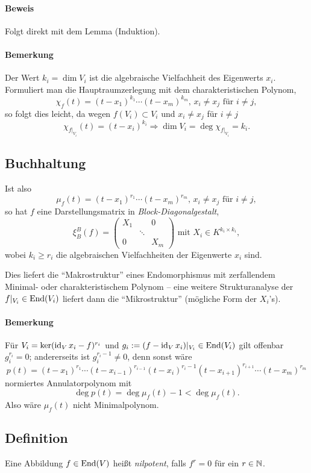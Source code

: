 \paragraph{Beweis}
	Folgt direkt mit dem Lemma (Induktion).

\paragraph{Bemerkung}
	Der Wert $ k_i = \dim V_i $ ist die algebraische Vielfachheit des Eigenwerts $ x_i $. Formuliert man die Hauptraumzerlegung mit dem charakteristischen Polynom,
		\[ \chi_f(t) = (t-x_1)^{k_1}\cdots (t-x_m)^{k_m},\, x_i \neq x_j \text{ für } i\neq j, \]
	so folgt dies leicht, da wegen $ f(V_i)\subset V_i $ und $ x_i\neq x_j $ für $ i\neq j $
		\[ \chi_{f|_{V_i}}(t) = (t-x_i)^{k_i}\Rightarrow \dim V_i = \deg \chi_{f|_{V_i}} = k_i. \]
\subsection{Buchhaltung}
	Ist also
		\[ \mu_f(t) = (t-x_1)^{r_1}\cdots (t-x_m)^{r_m},\, x_i\neq x_j \text{ für }i\neq j, \]
	so hat $ f $ eine Darstellungsmatrix in \emph{Block-Diagonalgestalt},
		\[ \xi_B^B(f) = \begin{pmatrix}
		X_1 & & 0 \\
		& \ddots & \\
		0 & & X_m
		\end{pmatrix} \text{ mit }X_i \in K^{k_i\times k_i}, \]
	wobei $ k_i\geq r_i $ die algebraischen Vielfachheiten der Eigenwerte $ x_i $ sind.
	
	Dies liefert die "`Makrostruktur"' eines Endomorphismus mit zerfallendem Minimal- oder charakteristischem Polynom -- eine weitere Strukturanalyse der $ f|_{V_i} \in \operatorname{End}(V_i) $ liefert dann die "`Mikrostruktur"' (mögliche Form der $ X_i $'s).
\paragraph{Bemerkung}
	Für $ V_i = \ker (\operatorname{id}_Vx_i-f)^{r_i} $ und $ g_i := (f-\operatorname{id}_Vx_i)|_{V_i} \in \operatorname{End}(V_i) $ gilt offenbar $ g_i^{r_i} = 0 $; andererseits ist $ g_i^{r_i-1}\neq 0 $, denn sonst wäre
		\[ p(t) = (t-x_1)^{r_1}\cdots (t-x_{i-1})^{r_{i-1}}(t-x_i)^{r_i-1}(t-x_{i+1})^{r_{i+1}}\cdots (t-x_m)^{r_m} \]
	normiertes Annulatorpolynom mit
		\[ \deg p(t) = \deg \mu_f(t)-1 < \deg \mu_f(t). \]
	Also wäre $ \mu_f(t) $ nicht Minimalpolynom.

\subsection{Definition}
	Eine Abbildung $ f\in \operatorname{End}(V) $ heißt \emph{nilpotent}, falls $ f^r=0 $ für ein $ r\in \mathbb{N} $.
